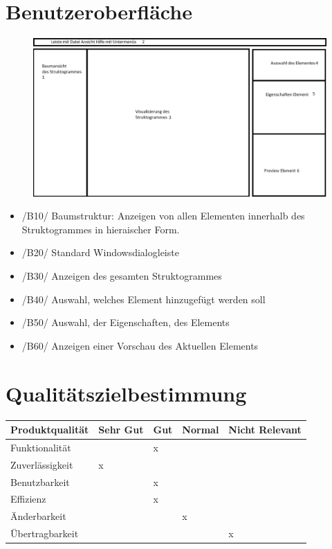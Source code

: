 \documentclass[a4paper,10pt]{report}
\begin{document}
\section{Benutzeroberfläche}
\begin{figure}[h!]
  \centering
    \includegraphics[width=1.3\textwidth]{gui-skizze.png}
\end{figure}
\begin{itemize}

\item /B10/ Baumstruktur: Anzeigen von allen Elementen innerhalb des Struktogrammes in hieraischer Form.
\item /B20/ Standard Windowsdialogleiste
\item /B30/ Anzeigen des gesamten Struktogrammes
\item /B40/ Auswahl, welches Element hinzugefügt werden soll
\item /B50/ Auswahl, der Eigenschaften, des Elements
\item /B60/ Anzeigen einer Vorschau des Aktuellen Elements

\end{itemize}
\section{Qualitätszielbestimmung}

\begin{center}
  \begin{tabular}{| l | l | l | l | l |}
    \hline
   	 Produktqualität & Sehr Gut & Gut  & Normal & Nicht Relevant \\ \hline
    	 Funktionalität &   &  x &  & \\ \hline
 	 Zuverlässigkeit & x  &   &  & \\ \hline
 	Benutzbarkeit &   &  x &  & \\ \hline
      	 Effizienz &   &  x &  & \\ \hline
      	 Änderbarkeit &   &  &  x & \\ \hline
      	Übertragbarkeit &   &   &  & x \\ \hline
  \end{tabular}
\end{center}
\end{document}
